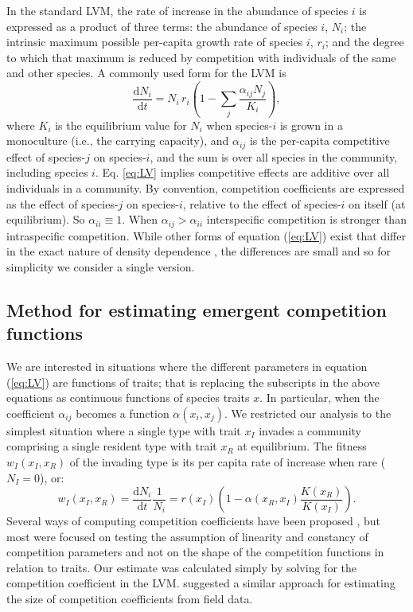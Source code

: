 \documentclass[a4paper,11pt]{article}
\newcommand{\ud}{\ensuremath{\mathrm{d}}}
\begin{document}
In the standard LVM, the rate of increase in the abundance of species $i$ is expressed as a product of three terms: the abundance of species $i$, $N_i$; the intrinsic maximum possible per-capita growth rate of species $i$, $r_i$; and the degree to which that maximum is reduced by competition with individuals of the same and other species. A commonly used form for the LVM is 
\begin{equation} \label{eq:LV} 
	\frac{\ud N_i}{\ud t} = N_i\, r_i \left(1 - \sum_j \frac{\alpha_{ij} N_j}{K_i}\right), 
\end{equation}
where $K_i$ is the equilibrium value for $N_i$ when species-$i$ is grown in a monoculture (i.e., the carrying capacity), and $\alpha_{ij}$ is the per-capita competitive effect of species-$j$ on species-$i$, and the sum is over all species in the community, including species $i$. Eq. \ref{eq:LV} implies competitive effects are additive over all individuals in a community. By convention, competition coefficients are expressed as the effect of species-$j$ on species-$i$, relative to the effect of species-$i$ on itself (at equilibrium).  So $\alpha_{ii} \equiv 1$. When $\alpha_{ij} > \alpha_{ii}$ interspecific competition is stronger than intraspecific competition. While other forms of equation (\ref{eq:LV}) exist that differ in the exact nature of density dependence \citep[e.g.][]{Leimar-2013}, the differences are small and so for simplicity we consider a single version.


\subsection{Method for estimating emergent competition functions}

We are interested in situations where the different parameters in equation (\ref{eq:LV}) are functions of traits; that is replacing the subscripts in the above equations as continuous functions of species traits $x$. In particular, when the coefficient $\alpha_{ij}$ becomes a function $\alpha(x_i, x_j)$. We restricted our analysis to the simplest situation where a single type with trait $x_I$ invades a community comprising a single resident type with trait $x_R$ at equilibrium. The fitness $w_I(x_I, x_R)$ of the invading type is its per capita rate of increase when rare ($N_I = 0$), or: 
\begin{equation}\label{eq:LVi}
  w_I(x_I, x_R) = \frac{\ud N_i}{\ud t} \frac{1}{N_i} =
    r(x_I)\left(1 - \alpha(x_R, x_I) \frac{K(x_R)}{K(x_I)}\right).
\end{equation}
Several ways of computing competition coefficients have been proposed \citep[e.g.,][]{Abrams-1987,Abrams-2008}, but most were focused on testing the assumption of linearity and constancy of competition parameters and not on the shape of the competition functions in relation to traits. Our estimate was calculated simply by solving for the competition coefficient in the LVM. \citet{Ricklefs-1973} suggested a similar approach for estimating the size of competition coefficients from field data. 
\end{document}
